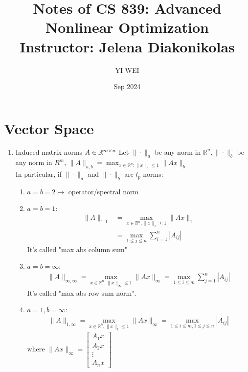 \documentclass[11pt]{article}
\title{Notes of CS 839: Advanced Nonlinear Optimization\\Instructor: Jelena Diakonikolas}
\author{YI WEI}
\date{Sep 2024}
\begin{document}
\maketitle
\tableofcontents

\section{Vector Space}


\begin{example}
    \begin{enumerate}
        \item Induced matrix norms 
                $A \in \mathbb{R}^{m \times n} $
                Let $\| \cdot \|_{a} $ be any norm in $\mathbb{R}^n, \| \cdot  \| _{b}$ be any norm in $R^m$,
                $\| A \|_{a,b} = \max_{x \in \mathbb{R}^n: \| x\|_{a} \le 1 } \| Ax \|_{b} $ \\
                In particular, if $\| \cdot \|_{a} $ and $\| \cdot \|_{b}$ are $l_{p}$ norms:
                \begin{enumerate}
                    \item $a=b=2 \to $ operator/spectral norm
                    \item $a=b=1$:
                            \begin{align}
                                \| A \|_{1,1} &= \max_{x \in \mathbb{R}^n, \| x \|_{1} \le 1} \| Ax \|_{1} \\
                                    &= \max_{1 \le j \le n}\sum_{i=1}^{n}| A_{ij} |
                            \end{align}
                            It's called "max abs column sum"
                    \item $a=b=\infty$:
                            \begin{align*}
                                \| A \| _{\infty,\infty} = \max_{x \in \mathbb{R}^n, \| x \| _{\infty} \le 1}
                                        \| Ax \| _{\infty} = \max_{1 \le i \le m} \sum_{j=1}^{n}|A_{ij}|
                            \end{align*}
                            It's called "max abs row sum norm". 
                    \item $a=1, b=\infty$:
                            \begin{align*}
                                \| A \| _{1,\infty} = \max_{x\in \mathbb{R}^n, \| x \| _{1} \le 1} \| Ax \|_{\infty}
                                        = \max_{1 \le i \le m, 1 \le j \le n} |A_{ij}|
                            \end{align*}
                            where $\| Ax \| _{\infty} = \begin{bmatrix} A_{1}x \\ A_{2}x \\ \vdots \\ A_{n}x \end{bmatrix}$
                \end{enumerate}
    \end{enumerate}
\end{example}
\end{document}
